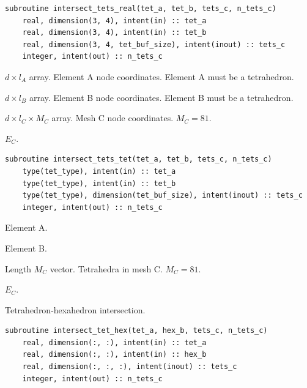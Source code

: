\documentclass{article}
\begin{document}
\begin{lstlisting}[language=FORTRAN]
  subroutine intersect_tets_real(tet_a, tet_b, tets_c, n_tets_c)
    real, dimension(3, 4), intent(in) :: tet_a
    real, dimension(3, 4), intent(in) :: tet_b
    real, dimension(3, 4, tet_buf_size), intent(inout) :: tets_c
    integer, intent(out) :: n_tets_c
\end{lstlisting}

\begin{description}[font=\ttfamily\bfseries,leftmargin=2.2\parindent,labelindent=1.7\parindent,noitemsep]
  \item[tet\_a] $d \times l_A$ array. Element A node coordinates. Element A must
    be a tetrahedron.
  \item[tet\_b] $d \times l_B$ array. Element B node coordinates. Element B must
    be a tetrahedron.
  \item[tets\_c] $d \times l_C \times M_C$ array. Mesh C node coordinates.
    $M_C = 81$.
  \item[n\_tets\_c] $E_C$.
\end{description}

\begin{lstlisting}[language=FORTRAN]
  subroutine intersect_tets_tet(tet_a, tet_b, tets_c, n_tets_c)
    type(tet_type), intent(in) :: tet_a
    type(tet_type), intent(in) :: tet_b
    type(tet_type), dimension(tet_buf_size), intent(inout) :: tets_c
    integer, intent(out) :: n_tets_c
\end{lstlisting}

\begin{description}[font=\ttfamily\bfseries,leftmargin=2.2\parindent,labelindent=1.7\parindent,noitemsep]
  \item[tet\_a] Element A.
  \item[tet\_b] Element B.
  \item[tets\_c] Length $M_C$ vector. Tetrahedra in mesh C. $M_C = 81$.
  \item[n\_tets\_c] $E_C$.
\end{description}

\noindent Tetrahedron-hexahedron intersection.

\begin{lstlisting}[language=FORTRAN]
  subroutine intersect_tet_hex(tet_a, hex_b, tets_c, n_tets_c)
    real, dimension(:, :), intent(in) :: tet_a
    real, dimension(:, :), intent(in) :: hex_b
    real, dimension(:, :, :), intent(inout) :: tets_c
    integer, intent(out) :: n_tets_c
\end{lstlisting}
\end{document}
